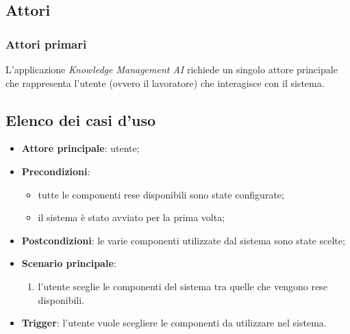 \documentclass[10pt, a4paper]{article}
\begin{document}
\subsection{Attori}
\subsubsection{Attori primari}
L'applicazione \textit{Knowledge Management AI} richiede un singolo attore principale che rappresenta l'utente (ovvero il lavoratore) che interagisce con il sistema.
\newpage
\subsection{Elenco dei casi d'uso}

    \begin{itemize}
        \item \textbf{Attore principale}: utente;
        \item \textbf{Precondizioni}: 
        \begin{itemize}
            \item tutte le componenti rese disponibili sono state configurate;
            \item il sistema è stato avviato per la prima volta;
        \end{itemize}
        \item \textbf{Postcondizioni}: le varie componenti utilizzate dal sistema sono state scelte;
        \item \textbf{Scenario principale}:
            \begin{enumerate}
                \item l'utente sceglie le componenti del sistema tra quelle che vengono rese disponibili.
            \end{enumerate}
        \item \textbf{Trigger}: l’utente vuole scegliere le componenti da utilizzare nel sistema.
    \end{itemize}


    
\end{document}
